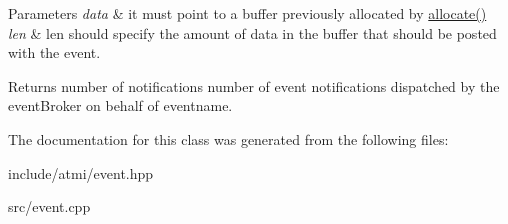 \begin{DoxyParams}{Parameters}
{\em data} & it must point to a buffer previously allocated by \hyperlink{classatmi_1_1tuxedo_a44e77e3e6216a8c3fb8be33d5d8fed93}{allocate()} \\
\hline
{\em len} & len should specify the amount of data in the buffer that should be posted with the event.\\
\hline
\end{DoxyParams}
\begin{DoxyReturn}{Returns}
number of notifications number of event notifications dispatched by the event\+Broker on behalf of eventname. 
\end{DoxyReturn}


The documentation for this class was generated from the following files\+:\begin{DoxyCompactItemize}
\item 
include/atmi/event.\+hpp\item 
src/event.\+cpp\end{DoxyCompactItemize}
